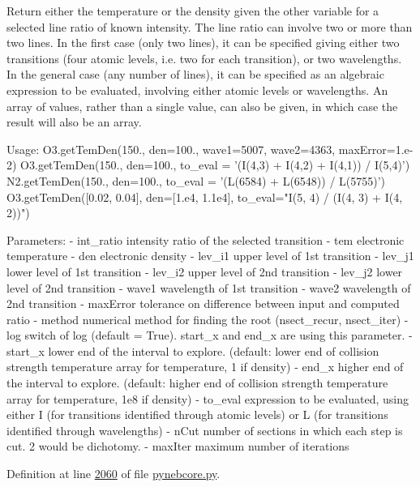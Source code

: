 \begin{DoxyVerb}Return either the temperature or the density given the other variable for a selected line ratio 
    of known intensity.
The line ratio can involve two or more than two lines. 
In the first case (only two lines), it can be specified giving either two transitions 
    (four atomic levels, i.e. two for each transition), or two wavelengths.
In the general case (any number of lines), it can be specified as an algebraic expression 
    to be evaluated, involving either atomic levels or wavelengths.
An array of values, rather than a single value, can also be given, in which case the result 
    will also be an array.
    
Usage: 
    O3.getTemDen(150., den=100., wave1=5007, wave2=4363, maxError=1.e-2)
    O3.getTemDen(150., den=100., to_eval = '(I(4,3) + I(4,2) + I(4,1)) / I(5,4)')
    N2.getTemDen(150., den=100., to_eval = '(L(6584) + L(6548)) / L(5755)')
    O3.getTemDen([0.02, 0.04], den=[1.e4, 1.1e4], to_eval="I(5, 4) / (I(4, 3) + I(4, 2))")

Parameters:
    - int_ratio    intensity ratio of the selected transition
    - tem          electronic temperature
    - den          electronic density
    - lev_i1       upper level of 1st transition
    - lev_j1       lower level of 1st transition
    - lev_i2       upper level of 2nd transition
    - lev_j2       lower level of 2nd transition
    - wave1        wavelength of 1st transition
    - wave2        wavelength of 2nd transition
    - maxError     tolerance on difference between input and computed ratio 
    - method       numerical method for finding the root (nsect_recur, nsect_iter)
    - log          switch of log (default = True). start_x and end_x are using this parameter.
    - start_x      lower end of the interval to explore. (default: lower end of collision 
            strength temperature array for temperature, 1 if density)
    - end_x        higher end of the interval to explore. (default: higher end of collision 
            strength temperature array for temperature, 1e8 if density)
    - to_eval      expression to be evaluated, using either I (for transitions identified 
            through atomic levels) or L (for transitions identified through wavelengths)
    - nCut        number of sections in which each step is cut. 2 would be dichotomy.
    - maxIter     maximum number of iterations\end{DoxyVerb}
 

Definition at line \hyperlink{pynebcore_8py_source_l02060}{2060} of file \hyperlink{pynebcore_8py_source}{pynebcore.\+py}.



